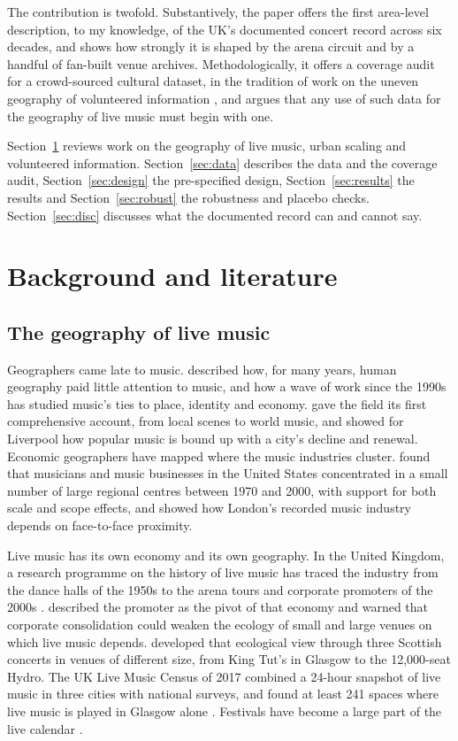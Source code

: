 \documentclass[11pt,a4paper]{article}
\begin{document}
The contribution is twofold. Substantively, the paper offers the first area-level description, to my knowledge, of the UK's documented concert record across six decades, and shows how strongly it is shaped by the arena circuit and by a handful of fan-built venue archives. Methodologically, it offers a coverage audit for a crowd-sourced cultural dataset, in the tradition of work on the uneven geography of volunteered information \citep{goodchild2007,haklay2010,graham2014}, and argues that any use of such data for the geography of live music must begin with one.

Section~\ref{sec:lit} reviews work on the geography of live music, urban scaling and volunteered information. Section~\ref{sec:data} describes the data and the coverage audit, Section~\ref{sec:design} the pre-specified design, Section~\ref{sec:results} the results and Section~\ref{sec:robust} the robustness and placebo checks. Section~\ref{sec:disc} discusses what the documented record can and cannot say.

\section{Background and literature}\label{sec:lit}
\subsection{The geography of live music}
Geographers came late to music. \citet{hudson2006} described how, for many years, human geography paid little attention to music, and how a wave of work since the 1990s has studied music's ties to place, identity and economy. \citet{connell2003} gave the field its first comprehensive account, from local scenes to world music, and \citet{cohen2007} showed for Liverpool how popular music is bound up with a city's decline and renewal. Economic geographers have mapped where the music industries cluster. \citet{florida2010} found that musicians and music businesses in the United States concentrated in a small number of large regional centres between 1970 and 2000, with support for both scale and scope effects, and \citet{watson2008} showed how London's recorded music industry depends on face-to-face proximity.

Live music has its own economy and its own geography. In the United Kingdom, a research programme on the history of live music has traced the industry from the dance halls of the 1950s to the arena tours and corporate promoters of the 2000s \citep{frith2013,frith2021}. \citet{brennan2011} described the promoter as the pivot of that economy and warned that corporate consolidation could weaken the ecology of small and large venues on which live music depends. \citet{behr2016} developed that ecological view through three Scottish concerts in venues of different size, from King Tut's in Glasgow to the 12,000-seat Hydro. The UK Live Music Census of 2017 combined a 24-hour snapshot of live music in three cities with national surveys, and found at least 241 spaces where live music is played in Glasgow alone \citep{webster2018}. Festivals have become a large part of the live calendar \citep{anderton2018}.
\end{document}
